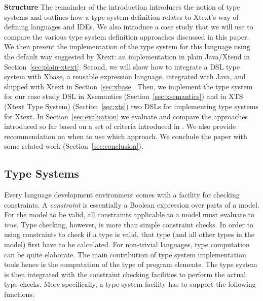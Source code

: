 \textbf{Structure} The remainder of the introduction introduces the notion of
type systems and outlines how a type system definition relates to Xtext's way of
defining languages and IDEs. We also introduce a case study that we will use to
compare the various type system definition approaches discussed in this paper. We then
present the implementation of the type system for this language using the
default way suggested by Xtext: an implementation in plain Java/Xtend 
in Section~\ref{sec:plain-xtext}. Second, we will show how to integrate a DSL
type system with Xbase, a reusable expression language, integrated
with Java, and shipped with Xtext in Section~\ref{sec:xbase}. Then, we implement
the type system for our case study DSL in Xsemantics (Section~\ref{sec:xsemantics}) and 
in XTS (Xtext Type System) (Section~\ref{sec:xts}) two DSLs for implementing type
systems for Xtext. In Section~\ref{sec:evaluation} we evaluate and compare
the approaches introduced so far based on a set of criteria introduced in
. We also provide recommendation on when to use which approach. We
conclude the paper with some related work (Section~\ref{sec:conclusion}).


\subsection{Type Systems}

Every language development environment comes with a facility for checking
constraints. A \emph{constraint} is essentially a Boolean expression over parts
of a model. For the model to be valid, all constraints applicable to a model
must evaluate to \emph{true}. Type checking, however, is more than simple
constraint checks. In order to using constraints to check if a type is valid,
that type (and all other types in the model) first have to be calculated. For
non-trivial languages, type computation can be quite elaborate. The main
contribution of type system implementation tools hence is the computation of the
type of program elements. The type system is then integrated with the constraint
checking facilities to perform the actual type checks. More specifically, a type
system facility has to support the following functions:

